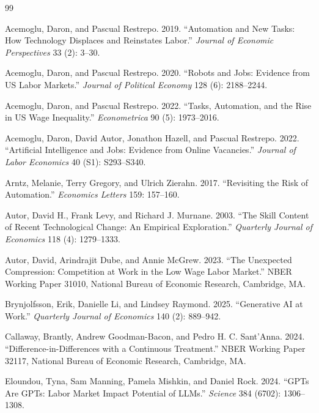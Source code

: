 \documentclass[12pt,leqno]{article}
\begin{document}
\begin{thebibliography}{99}
\setlength{\itemsep}{4pt}

Acemoglu, Daron, and Pascual Restrepo. 2019. ``Automation and New Tasks: How Technology Displaces and Reinstates Labor.'' \emph{Journal of Economic Perspectives} 33 (2): 3--30.

Acemoglu, Daron, and Pascual Restrepo. 2020. ``Robots and Jobs: Evidence from US Labor Markets.'' \emph{Journal of Political Economy} 128 (6): 2188--2244.

Acemoglu, Daron, and Pascual Restrepo. 2022. ``Tasks, Automation, and the Rise in US Wage Inequality.'' \emph{Econometrica} 90 (5): 1973--2016.

Acemoglu, Daron, David Autor, Jonathon Hazell, and Pascual Restrepo. 2022. ``Artificial Intelligence and Jobs: Evidence from Online Vacancies.'' \emph{Journal of Labor Economics} 40 (S1): S293--S340.

Arntz, Melanie, Terry Gregory, and Ulrich Zierahn. 2017. ``Revisiting the Risk of Automation.'' \emph{Economics Letters} 159: 157--160.

Autor, David H., Frank Levy, and Richard J. Murnane. 2003. ``The Skill Content of Recent Technological Change: An Empirical Exploration.'' \emph{Quarterly Journal of Economics} 118 (4): 1279--1333.

Autor, David, Arindrajit Dube, and Annie McGrew. 2023. ``The Unexpected Compression: Competition at Work in the Low Wage Labor Market.'' NBER Working Paper 31010, National Bureau of Economic Research, Cambridge, MA.

Brynjolfsson, Erik, Danielle Li, and Lindsey Raymond. 2025. ``Generative AI at Work.'' \emph{Quarterly Journal of Economics} 140 (2): 889--942.

Callaway, Brantly, Andrew Goodman-Bacon, and Pedro H. C. Sant'Anna. 2024. ``Difference-in-Differences with a Continuous Treatment.'' NBER Working Paper 32117, National Bureau of Economic Research, Cambridge, MA.

Eloundou, Tyna, Sam Manning, Pamela Mishkin, and Daniel Rock. 2024. ``GPTs Are GPTs: Labor Market Impact Potential of LLMs.'' \emph{Science} 384 (6702): 1306--1308.


\end{thebibliography}
\end{document}
